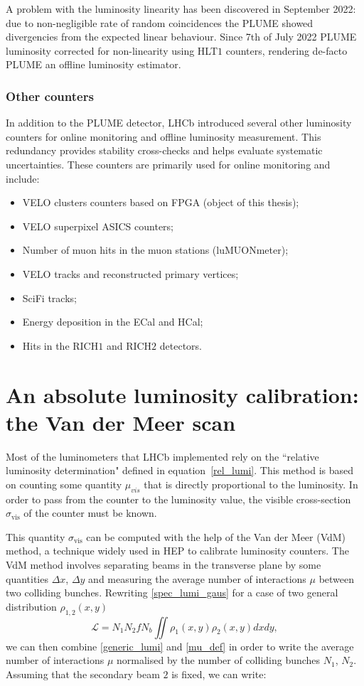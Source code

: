 A problem with the luminosity linearity has been discovered in September 2022: due to non-negligible rate of random coincidences the PLUME showed divergencies from the expected linear behaviour. Since 7th of July 2022 PLUME luminosity corrected for non-linearity using HLT$1$ counters, rendering de-facto PLUME an offline luminosity estimator.


\subsubsection{Other counters} 
In addition to the PLUME detector, LHCb introduced several other luminosity counters for online monitoring and offline luminosity measurement. This redundancy provides stability cross-checks and helps evaluate systematic uncertainties.
These counters are primarily used for online monitoring and include:
\begin{itemize}
   \item VELO clusters counters based on FPGA (object of this thesis);
   \item VELO superpixel ASICS counters;
   \item Number of muon hits in the muon stations (luMUONmeter);
   \item VELO tracks and reconstructed primary vertices;
   \item SciFi tracks;
   \item Energy deposition in the ECal and HCal;
    \item Hits in the RICH$1$ and RICH$2$ detectors.
\end{itemize}


\section{An absolute luminosity calibration: the Van der Meer scan}
Most of the luminometers that LHCb implemented rely on the ``relative luminosity determination" defined in equation~\eqref{rel_lumi}. This method is based on counting some quantity $\mu_{vis}$ that is directly proportional to the luminosity. In order to pass from the counter to the luminosity value, the visible cross-section $\sigma_{\text{vis}}$ of the counter must be known. 

This quantity $\sigma_{\text{vis}}$ can be computed with the help of the Van der Meer (VdM) method, a technique widely used in HEP to calibrate luminosity counters. The VdM method involves separating beams in the transverse plane by some quantities $\Delta x$, $\Delta y$ and measuring the average number of interactions $\mu$ between two colliding bunches. 
Rewriting \eqref{spec_lumi_gaus} for a case of two general distribution $\rho_{1,2} (x,y)$
\begin{equation}
    \mathcal{L} = N_1 N_2 f N_b\iint \rho_1(x,y) \rho_2(x,y) dxdy,\label{generic_lumi}
\end{equation}
we can then combine \eqref{generic_lumi} and \eqref{mu_def} in order to write the average number of interactions $\mu$ normalised by the number of colliding bunches $N_1$, $N_2$. Assuming that the secondary beam $2$ is fixed, we can write:

